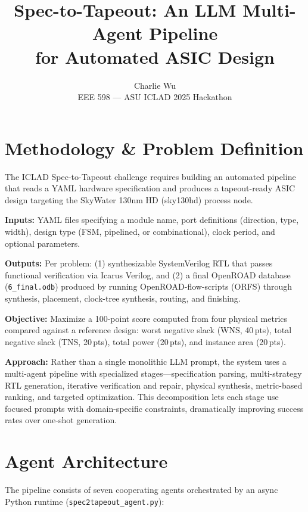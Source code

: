 \documentclass[10pt]{article}
\title{\textbf{Spec-to-Tapeout: An LLM Multi-Agent Pipeline\\for Automated ASIC Design}}
\author{Charlie Wu \\ EEE 598 --- ASU ICLAD 2025 Hackathon}
\date{}
\begin{document}
\maketitle

\section{Methodology \& Problem Definition}

The ICLAD Spec-to-Tapeout challenge requires building an automated pipeline that reads a YAML hardware specification and produces a tapeout-ready ASIC design targeting the SkyWater 130nm HD (sky130hd) process node.

\textbf{Inputs:} YAML files specifying a module name, port definitions (direction, type, width), design type (FSM, pipelined, or combinational), clock period, and optional parameters.

\textbf{Outputs:} Per problem: (1) synthesizable SystemVerilog RTL that passes functional verification via Icarus Verilog, and (2) a final OpenROAD database (\texttt{6\_final.odb}) produced by running OpenROAD-flow-scripts (ORFS) through synthesis, placement, clock-tree synthesis, routing, and finishing.

\textbf{Objective:} Maximize a 100-point score computed from four physical metrics compared against a reference design: worst negative slack (WNS, 40\,pts), total negative slack (TNS, 20\,pts), total power (20\,pts), and instance area (20\,pts).

\textbf{Approach:} Rather than a single monolithic LLM prompt, the system uses a multi-agent pipeline with specialized stages---specification parsing, multi-strategy RTL generation, iterative verification and repair, physical synthesis, metric-based ranking, and targeted optimization. This decomposition lets each stage use focused prompts with domain-specific constraints, dramatically improving success rates over one-shot generation.

\section{Agent Architecture}

The pipeline consists of seven cooperating agents orchestrated by an async Python runtime (\texttt{spec2tapeout\_agent.py}):
\end{document}
